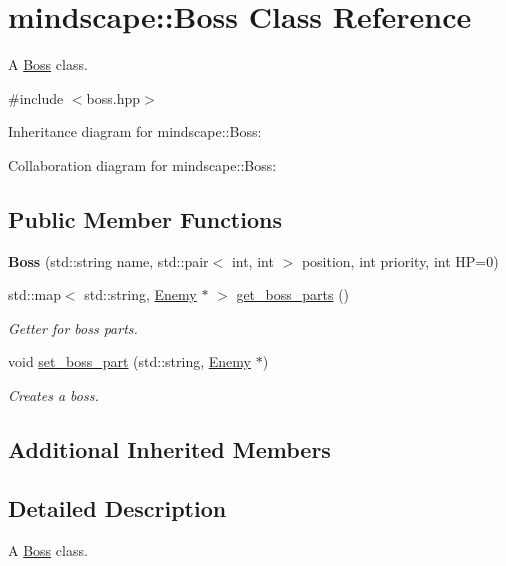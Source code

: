 \hypertarget{classmindscape_1_1_boss}{}\section{mindscape\+:\+:Boss Class Reference}
\label{classmindscape_1_1_boss}


A \hyperlink{classmindscape_1_1_boss}{Boss} class.  




{\ttfamily \#include $<$boss.\+hpp$>$}



Inheritance diagram for mindscape\+:\+:Boss\+:


Collaboration diagram for mindscape\+:\+:Boss\+:
\subsection*{Public Member Functions}
\begin{DoxyCompactItemize}
\item 
{\bfseries Boss} (std\+::string name, std\+::pair$<$ int, int $>$ position, int priority, int HP=0)\hypertarget{classmindscape_1_1_boss_af33cbd15d9179b25695dd1c9165bf4c3}{}\label{classmindscape_1_1_boss_af33cbd15d9179b25695dd1c9165bf4c3}

\item 
std\+::map$<$ std\+::string, \hyperlink{classmindscape_1_1_enemy}{Enemy} $\ast$ $>$ \hyperlink{classmindscape_1_1_boss_a8d557eed8f62a95182140d7f6170ed9e}{get\+\_\+boss\+\_\+parts} ()
\begin{DoxyCompactList}\small\item\em Getter for boss\textquotesingle{} parts. \end{DoxyCompactList}\item 
void \hyperlink{classmindscape_1_1_boss_a1f4a5e7e3d9ab6a39c607a317440aabe}{set\+\_\+boss\+\_\+part} (std\+::string, \hyperlink{classmindscape_1_1_enemy}{Enemy} $\ast$)
\begin{DoxyCompactList}\small\item\em Creates a boss. \end{DoxyCompactList}\end{DoxyCompactItemize}
\subsection*{Additional Inherited Members}


\subsection{Detailed Description}
A \hyperlink{classmindscape_1_1_boss}{Boss} class. 

